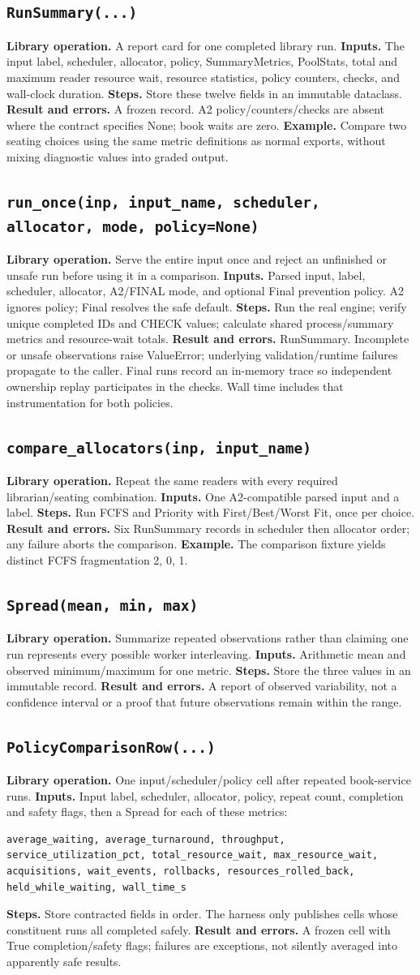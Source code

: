 \documentclass[11pt,a4paper]{article}
\newcommand{\routine}[2]{\subsection{\texorpdfstring{\texttt{#1}}{#2}}}
\newcommand{\librarymeaning}{\textbf{Library operation.} }
\newcommand{\arguments}{\textbf{Inputs.} }
\newcommand{\steps}{\textbf{Steps.} }
\newcommand{\result}{\textbf{Result and errors.} }
\newcommand{\example}{\textbf{Example.} }
\begin{document}
\routine{RunSummary(...)}{RunSummary record}
\librarymeaning A report card for one completed library run.
\arguments The input label, scheduler, allocator, policy, SummaryMetrics,
PoolStats, total and maximum reader resource wait, resource statistics,
policy counters, checks, and wall-clock duration.
\steps Store these twelve fields in an immutable dataclass.
\result A frozen record. A2 policy/counters/checks are absent where the
contract specifies None; book waits are zero.
\example Compare two seating choices using the same metric definitions as
normal exports, without mixing diagnostic values into graded output.

\routine{run\_once(inp, input\_name, scheduler, allocator, mode, policy=None)}{Run once}
\librarymeaning Serve the entire input once and reject an unfinished or unsafe
run before using it in a comparison.
\arguments Parsed input, label, scheduler, allocator, A2/FINAL mode, and optional
Final prevention policy. A2 ignores policy; Final resolves the safe default.
\steps Run the real engine; verify unique completed IDs and CHECK values;
calculate shared process/summary metrics and resource-wait totals.
\result RunSummary. Incomplete or unsafe observations raise ValueError;
underlying validation/runtime failures propagate to the caller. Final runs
record an in-memory trace so independent ownership replay participates in the
checks. Wall time includes that instrumentation for both policies.

\routine{compare\_allocators(inp, input\_name)}{Compare allocators}
\librarymeaning Repeat the same readers with every required librarian/seating
combination.
\arguments One A2-compatible parsed input and a label.
\steps Run FCFS and Priority with First/Best/Worst Fit, once per choice.
\result Six RunSummary records in scheduler then allocator order; any failure
aborts the comparison.
\example The comparison fixture yields distinct FCFS fragmentation 2, 0, 1.

\routine{Spread(mean, min, max)}{Spread record}
\librarymeaning Summarize repeated observations rather than claiming one run
represents every possible worker interleaving.
\arguments Arithmetic mean and observed minimum/maximum for one metric.
\steps Store the three values in an immutable record.
\result A report of observed variability, not a confidence interval or a proof
that future observations remain within the range.

\routine{PolicyComparisonRow(...)}{PolicyComparisonRow record}
\librarymeaning One input/scheduler/policy cell after repeated book-service runs.
\arguments Input label, scheduler, allocator, policy, repeat count, completion
and safety flags, then a Spread for each of these metrics:
\begin{lstlisting}
average_waiting, average_turnaround, throughput,
service_utilization_pct, total_resource_wait, max_resource_wait,
acquisitions, wait_events, rollbacks, resources_rolled_back,
held_while_waiting, wall_time_s
\end{lstlisting}
\steps Store contracted fields in order. The harness only publishes cells
whose constituent runs all completed safely.
\result A frozen cell with True completion/safety flags; failures are exceptions,
not silently averaged into apparently safe results.
\end{document}
